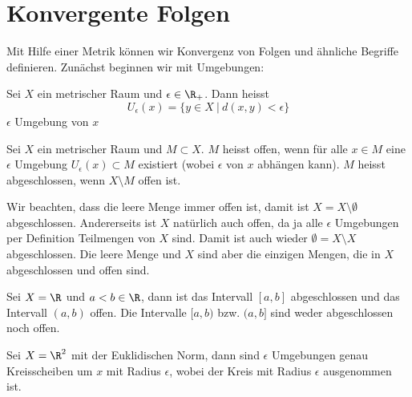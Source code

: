 \documentclass[letterpaper,10pt,english]{jupyterBook}
\begin{document}
\section{Konvergente Folgen}
\label{\detokenize{metrik/konvfolgen:konvergente-folgen}}\label{\detokenize{metrik/konvfolgen::doc}}
Mit Hilfe einer Metrik können wir Konvergenz von Folgen und ähnliche Begriffe definieren. Zunächst beginnen wir mit Umgebungen:
\label{metrik/konvfolgen:definition-0}
\begin{definition}{}{}



Sei \(X\) ein metrischer Raum und \(\epsilon \in \R_+\). Dann heisst
\begin{equation*}
 U_\epsilon(x) = \{ y \in X~|~d(x,y) < \epsilon \}
\end{equation*}
\(\epsilon\) Umgebung von \(x\)
\end{definition}
\label{metrik/konvfolgen:definition-1}
\begin{definition}{}{}



Sei \(X\) ein metrischer Raum und \(M \subset X\). \(M\) heisst offen, wenn für alle \(x \in M\) eine \(\epsilon\) Umgebung \(U_\epsilon(x) \subset M\) existiert (wobei \(\epsilon\) von \(x\) abhängen kann). \(M\) heisst abgeschlossen, wenn \(X \setminus M\) offen ist.
\end{definition}

Wir beachten, dass die leere Menge immer offen ist, damit ist \(X =X \setminus \emptyset\) abgeschlossen. Andererseits ist \(X\) natürlich auch offen, da ja alle \(\epsilon\) Umgebungen per Definition Teilmengen von \(X\) sind. Damit ist auch wieder \(\emptyset =  X \setminus X\) abgeschlossen. Die leere Menge und \(X\) sind aber die einzigen Mengen, die in \(X\) abgeschlossen und offen sind.
\label{metrik/konvfolgen:example-2}
\begin{example}{}{}



Sei \(X=\R\) und \(a < b \in \R\), dann ist das Intervall \([a,b]\) abgeschlossen und das Intervall \((a,b)\) offen. Die Intervalle \([a,b)\) bzw. \((a,b]\) sind weder abgeschlossen noch offen.
\end{example}
\label{metrik/konvfolgen:example-3}
\begin{example}{}{}



Sei \(X=\R^2\) mit der Euklidischen Norm, dann sind \(\epsilon\) Umgebungen genau Kreisscheiben um \(x\) mit Radius \(\epsilon\), wobei der Kreis mit Radius \(\epsilon\) ausgenommen ist.
\end{example}
\end{document}
